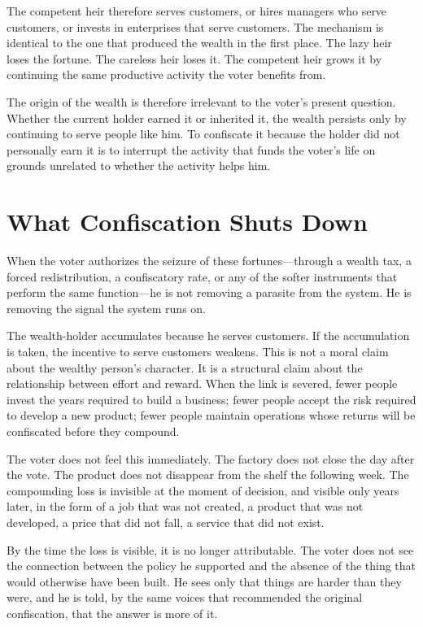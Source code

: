 \documentclass[11pt]{article}
\begin{document}
The competent heir therefore serves customers, or hires managers who serve customers, or invests in enterprises that serve customers. The mechanism is identical to the one that produced the wealth in the first place. The lazy heir loses the fortune. The careless heir loses it. The competent heir grows it by continuing the same productive activity the voter benefits from.

The origin of the wealth is therefore irrelevant to the voter's present question. Whether the current holder earned it or inherited it, the wealth persists only by continuing to serve people like him. To confiscate it because the holder did not personally earn it is to interrupt the activity that funds the voter's life on grounds unrelated to whether the activity helps him.

\section{What Confiscation Shuts Down}

When the voter authorizes the seizure of these fortunes---through a wealth tax, a forced redistribution, a confiscatory rate, or any of the softer instruments that perform the same function---he is not removing a parasite from the system. He is removing the signal the system runs on.

The wealth-holder accumulates because he serves customers. If the accumulation is taken, the incentive to serve customers weakens. This is not a moral claim about the wealthy person's character. It is a structural claim about the relationship between effort and reward. When the link is severed, fewer people invest the years required to build a business; fewer people accept the risk required to develop a new product; fewer people maintain operations whose returns will be confiscated before they compound.

The voter does not feel this immediately. The factory does not close the day after the vote. The product does not disappear from the shelf the following week. The compounding loss is invisible at the moment of decision, and visible only years later, in the form of a job that was not created, a product that was not developed, a price that did not fall, a service that did not exist.

By the time the loss is visible, it is no longer attributable. The voter does not see the connection between the policy he supported and the absence of the thing that would otherwise have been built. He sees only that things are harder than they were, and he is told, by the same voices that recommended the original confiscation, that the answer is more of it.
\end{document}
